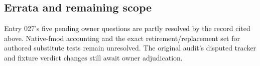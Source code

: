 \subsection*{Errata and remaining scope}
Entry 027's five pending owner questions are partly resolved by the record cited
above. Native-fmod accounting and the exact retirement/replacement set for authored
substitute tests remain unresolved. The original audit's disputed tracker and
fixture verdict changes still await owner adjudication.
